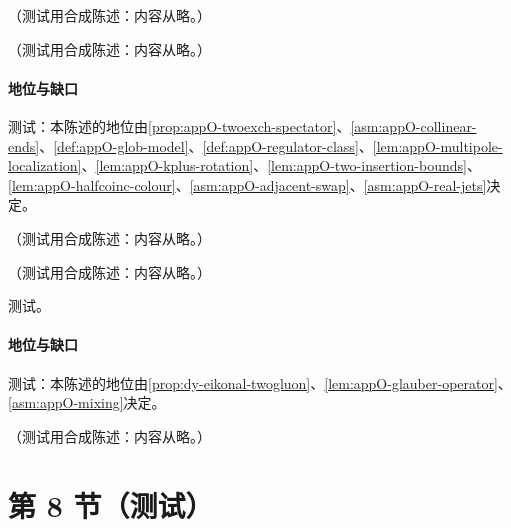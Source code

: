 \begin{remark}\label{rem:appO-halfcoinc}
（测试用合成陈述：内容从略。）
\end{remark}

\begin{proposition}\label{prop:appO-halfcoinc-sensitivity}
（测试用合成陈述：内容从略。）
\end{proposition}
\paragraph{地位与缺口}测试：本陈述的地位由\cref{prop:appO-twoexch-spectator}、\cref{asm:appO-collinear-ends}、\cref{def:appO-glob-model}、\cref{def:appO-regulator-class}、\cref{lem:appO-multipole-localization}、\cref{lem:appO-kplus-rotation}、\cref{lem:appO-two-insertion-bounds}、\cref{lem:appO-halfcoinc-colour}、\cref{asm:appO-adjacent-swap}、\cref{asm:appO-real-jets}决定。

\begin{remark}\label{rem:appO-cut-ss}
（测试用合成陈述：内容从略。）
\end{remark}

\begin{proposition}\label{prop:appO-g6-ladder}
（测试用合成陈述：内容从略。）
\end{proposition}
\begin{proofsketch}测试。\end{proofsketch}
\paragraph{地位与缺口}测试：本陈述的地位由\cref{prop:dy-eikonal-twogluon}、\cref{lem:appO-glauber-operator}、\cref{asm:appO-mixing}决定。

\begin{lemma}[整函数载子]\label{lem:appO-carrier}
（测试用合成陈述：内容从略。）
\end{lemma}

\section{第 8 节（测试）}\label{sec:appO-wilson}

